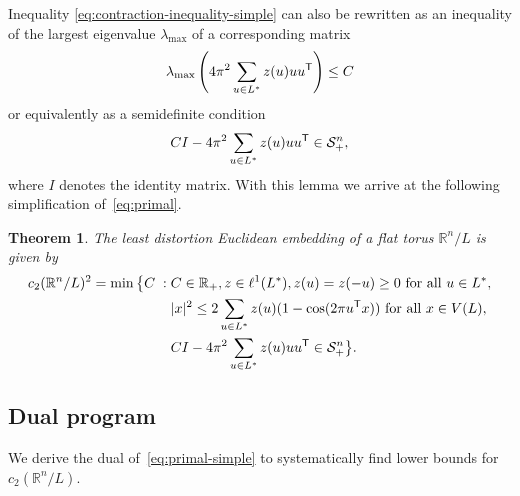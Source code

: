 \documentclass{amsart}
\newtheorem{theorem}[defin]{Theorem}
\newcommand{\R}{\mathbb{R}}
\begin{document}
Inequality \eqref{eq:contraction-inequality-simple} can also be
rewritten as an inequality of the largest eigenvalue $\lambda_{\max}$
of a corresponding matrix
\[
  \lambda_{\max} \left(   4 \pi^2 \sum\limits_{u\in L^*} z(u) uu^{\sf
      T} \right) \leq C
\]
or equivalently as a semidefinite condition
\[
  C I - 4 \pi^2 \sum\limits_{u\in L^*} z(u) uu^{\sf
      T}  \in \mathcal{S}_+^n,
  \]
  where $I$ denotes the identity matrix. With this lemma we
  arrive at the following simplification of~\eqref{eq:primal}.

  \begin{theorem}
  \label{thm:primal-simple}
  The least distortion Euclidean embedding of a flat torus $\R^n / L$
  is given by
  \begin{equation}
  \label{eq:primal-simple}
  \begin{split}
  c_2(\R^n/L)^2 = \min\big\{C \; : \; & C \in \R_+, z \in \ell^1(L^*),
  z(u) = z(-u) \geq 0 \text{ for all } u \in L^*,\\
  &  |x|^2 \leq 2 \sum_{u \in L^*} z(u) (1- \cos(2\pi u^{\sf T} x))
  \text{ for all } x \in V(L),\\
  & CI - 4\pi^2 \sum_{u \in L^*} z(u) uu^{\sf T}\in \mathcal{S}^n_+ \big\}.
  \end{split}
\end{equation}
\end{theorem}

%
%
%

\subsection{Dual program}

We derive the dual of~\eqref{eq:primal-simple} to systematically find
lower bounds for $c_2(\R^n / L)$.
\end{document}

